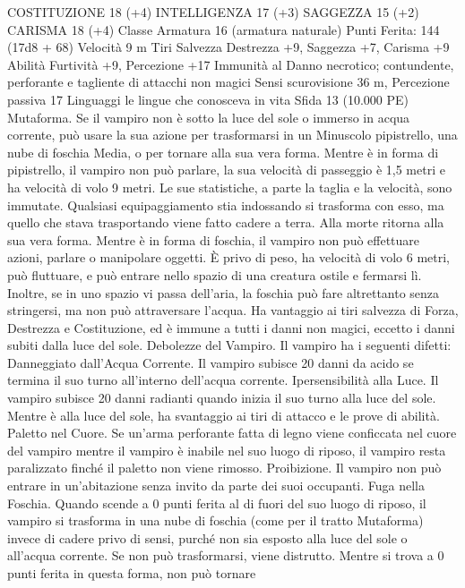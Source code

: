 \begin{multicols}{2}
COSTITUZIONE 18 (+4)
INTELLIGENZA 17 (+3)
SAGGEZZA 15 (+2)
CARISMA 18 (+4)
Classe Armatura 16 (armatura naturale)
\hspace*{0pt}\hfill{Punti Ferita}: 144 (17d8 + 68)
Velocità 9 m
Tiri Salvezza Destrezza +9, Saggezza +7, Carisma +9
Abilità Furtività +9, Percezione +17
Immunità al Danno necrotico; contundente, perforante e
tagliente di attacchi non magici
Sensi scurovisione 36 m, Percezione passiva 17
Linguaggi le lingue che conosceva in vita
Sfida 13 (10.000 PE)
Mutaforma. Se il vampiro non è sotto la luce del sole o immerso
in acqua corrente, può usare la sua azione per trasformarsi in un
Minuscolo pipistrello, una nube di foschia Media, o per tornare
alla sua vera forma.
Mentre è in forma di pipistrello, il vampiro non può parlare, la
sua velocità di passeggio è 1,5 metri e ha velocità di volo 9
metri. Le sue statistiche, a parte la taglia e la velocità, sono
immutate. Qualsiasi equipaggiamento stia indossando si
trasforma con esso, ma quello che stava trasportando viene fatto
cadere a terra. Alla morte ritorna alla sua vera forma.
Mentre è in forma di foschia, il vampiro non può effettuare
azioni, parlare o manipolare oggetti. È privo di peso, ha velocità
di volo 6 metri, può fluttuare, e può entrare nello spazio di una
creatura ostile e fermarsi lì. Inoltre, se in uno spazio vi passa
dell’aria, la foschia può fare altrettanto senza stringersi, ma non
può attraversare l’acqua. Ha vantaggio ai tiri salvezza di Forza,
Destrezza e Costituzione, ed è immune a tutti i danni non magici,
eccetto i danni subiti dalla luce del sole.
Debolezze del Vampiro. Il vampiro ha i seguenti difetti:
Danneggiato dall’Acqua Corrente. Il vampiro subisce 20 danni
da acido se termina il suo turno all’interno dell’acqua corrente.
Ipersensibilità alla Luce. Il vampiro subisce 20 danni radianti
quando inizia il suo turno alla luce del sole. Mentre è alla luce
del sole, ha svantaggio ai tiri di attacco e le prove di abilità.
Paletto nel Cuore. Se un’arma perforante fatta di legno viene
conficcata nel cuore del vampiro mentre il vampiro è inabile nel
suo luogo di riposo, il vampiro resta paralizzato finché il paletto
non viene rimosso.
Proibizione. Il vampiro non può entrare in un’abitazione senza
invito da parte dei suoi occupanti.
Fuga nella Foschia. Quando scende a 0 punti ferita al di fuori
del suo luogo di riposo, il vampiro si trasforma in una nube di
foschia (come per il tratto Mutaforma) invece di cadere privo di
sensi, purché non sia esposto alla luce del sole o all’acqua
corrente. Se non può trasformarsi, viene distrutto.
Mentre si trova a 0 punti ferita in questa forma, non può tornare

\end{multicols}
